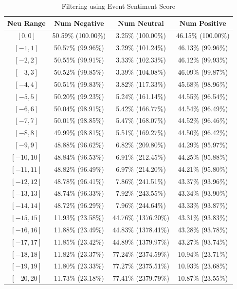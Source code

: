 \documentclass[12pt]{article}
\begin{document}
	\begin{table}[H]
		\small
		\centering
		\caption{Filtering using Event Sentiment Score}
		\begin{tabular}{c|c c c}
\toprule
Neu Range & Num Negative & Num Neutral & Num Positive \\
\midrule
$[0,0]$ & 50.59\% (100.00\%) & 3.25\% (100.00\%) & 46.15\% (100.00\%) \\
$[-1,1]$ & 50.57\% (99.96\%) & 3.29\% (101.24\%) & 46.13\% (99.96\%) \\
$[-2,2]$ & 50.55\% (99.91\%) & 3.33\% (102.33\%) & 46.12\% (99.93\%) \\
$[-3,3]$ & 50.52\% (99.85\%) & 3.39\% (104.08\%) & 46.09\% (99.87\%) \\
$[-4,4]$ & 50.51\% (99.83\%) & 3.82\% (117.33\%) & 45.68\% (98.96\%) \\
$[-5,5]$ & 50.20\% (99.23\%) & 5.24\% (161.14\%) & 44.55\% (96.54\%) \\
$[-6,6]$ & 50.04\% (98.91\%) & 5.42\% (166.77\%) & 44.54\% (96.49\%) \\
$[-7,7]$ & 50.01\% (98.85\%) & 5.47\% (168.07\%) & 44.52\% (96.46\%) \\
$[-8,8]$ & 49.99\% (98.81\%) & 5.51\% (169.27\%) & 44.50\% (96.42\%) \\
$[-9,9]$ & 48.88\% (96.62\%) & 6.82\% (209.80\%) & 44.29\% (95.97\%) \\
$[-10,10]$ & 48.84\% (96.53\%) & 6.91\% (212.45\%) & 44.25\% (95.88\%) \\
$[-11,11]$ & 48.82\% (96.49\%) & 6.97\% (214.20\%) & 44.21\% (95.80\%) \\
$[-12,12]$ & 48.78\% (96.41\%) & 7.86\% (241.51\%) & 43.37\% (93.96\%) \\
$[-13,13]$ & 48.74\% (96.33\%) & 7.92\% (243.55\%) & 43.34\% (93.90\%) \\
$[-14,14]$ & 48.72\% (96.29\%) & 7.96\% (244.64\%) & 43.33\% (93.87\%) \\
$[-15,15]$ & 11.93\% (23.58\%) & 44.76\% (1376.20\%) & 43.31\% (93.83\%) \\
$[-16,16]$ & 11.88\% (23.49\%) & 44.83\% (1378.41\%) & 43.28\% (93.78\%) \\
$[-17,17]$ & 11.85\% (23.42\%) & 44.89\% (1379.97\%) & 43.27\% (93.74\%) \\
$[-18,18]$ & 11.82\% (23.37\%) & 77.24\% (2374.59\%) & 10.94\% (23.71\%) \\
$[-19,19]$ & 11.80\% (23.33\%) & 77.27\% (2375.51\%) & 10.93\% (23.68\%) \\
$[-20,20]$ & 11.73\% (23.18\%) & 77.41\% (2379.79\%) & 10.87\% (23.55\%) \\

\end{tabular}
\end{table}
\end{document}
